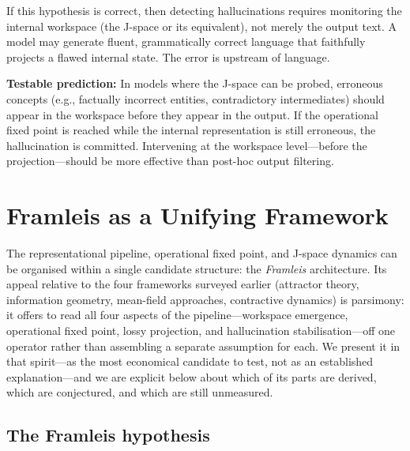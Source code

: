 \documentclass[11pt,a4paper]{article}
\theoremstyle{definition}
\begin{document}
If this hypothesis is correct, then detecting hallucinations requires
monitoring the internal workspace (the J-space or its equivalent), not merely
the output text. A model may generate fluent, grammatically correct language
that faithfully projects a flawed internal state. The error is upstream of
language.

\textbf{Testable prediction:} In models where the J-space can be probed,
erroneous concepts (e.g., factually incorrect entities, contradictory
intermediates) should appear in the workspace before they appear in the output.
If the operational fixed point is reached while the internal representation is
still erroneous, the hallucination is committed. Intervening at the workspace
level---before the projection---should be more effective than post-hoc output
filtering.

\section{Framleis as a Unifying Framework}
\label{sec:framleis}

The representational pipeline, operational fixed point, and J-space dynamics
can be organised within a single candidate structure: the \emph{Framleis}
architecture. Its appeal relative to the four frameworks surveyed earlier
(attractor theory, information geometry, mean-field approaches, contractive
dynamics) is parsimony: it offers to read all four aspects of the pipeline---workspace
emergence, operational fixed point, lossy projection, and hallucination
stabilisation---off one operator rather than assembling a separate assumption for
each. We present it in that spirit---as the most economical candidate to test, not
as an established explanation---and we are explicit below about which of its parts
are derived, which are conjectured, and which are still unmeasured.

\subsection{The Framleis hypothesis}
\end{document}
